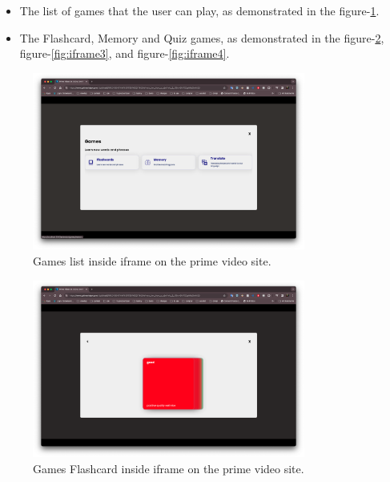\documentclass[12pt]{article}
\begin{document}
    \begin{itemize}
    \item The list of games that the user can play, as demonstrated in the figure-\ref{fig:iframe1}.
    \item The Flashcard, Memory and Quiz games, as demonstrated in the figure-\ref{fig:iframe2}, figure-\ref{fig:iframe3}, and figure-\ref{fig:iframe4}.
    \end{itemize}


    \begin{figure}[!h]
      \centering
      \caption{
      Games list inside iframe on the prime video site.
      }
      \label{fig:iframe1}
      \includegraphics[width=0.8\textwidth]{assets/9.png}
    \end{figure}

    \begin{figure}[!h]
      \centering
      \caption{
      Games Flashcard inside iframe on the prime video site.
      }
      \label{fig:iframe2}
      \includegraphics[width=0.8\textwidth]{assets/10.png}
    \end{figure}
\end{document}
